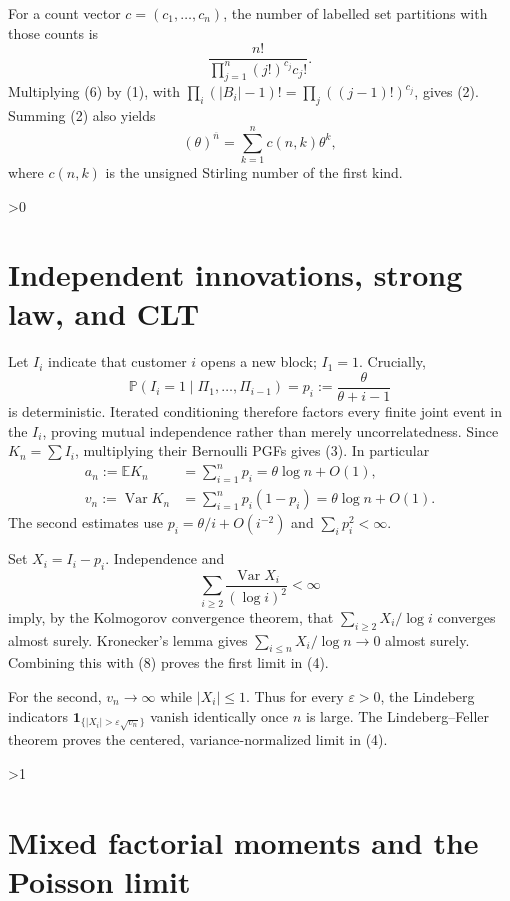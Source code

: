 \documentclass[10pt]{article}
\providecommand{\CRevisionRound}{2}
\theoremstyle{remark}
\newcommand{\rising}[2]{(#1)^{\overline{#2}}}
\begin{document}
For a count vector $c=(c_1,\ldots,c_n)$, the number of labelled set
partitions with those counts is
\[
 \frac{n!}{\prod_{j=1}^n(j!)^{c_j}c_j!}.                 \tag{6}
\]
Multiplying (6) by (1), with
$\prod_i(|B_i|-1)!=\prod_j((j-1)!)^{c_j}$, gives (2).
Summing (2) also yields
\[
 \rising{\theta}{n}=\sum_{k=1}^n c(n,k)\theta^k,
\]
where $c(n,k)$ is the unsigned Stirling number of the first kind.

\ifnum\CRevisionRound>0
\section{Independent innovations, strong law, and CLT}

Let $I_i$ indicate that customer $i$ opens a new block; $I_1=1$.
Crucially,
\[
 \mathbb P(I_i=1\mid\Pi_1,\ldots,\Pi_{i-1})
 =p_i:=\frac{\theta}{\theta+i-1}                         \tag{7}
\]
is deterministic.  Iterated conditioning therefore factors every finite
joint event in the $I_i$, proving mutual independence rather than merely
uncorrelatedness.  Since $K_n=\sum I_i$, multiplying their Bernoulli PGFs
gives (3).  In particular
\begin{align*}
 a_n:=\mathbb EK_n&=\sum_{i=1}^np_i=\theta\log n+O(1),\\
 v_n:=\operatorname{Var}K_n&=\sum_{i=1}^np_i(1-p_i)
                         =\theta\log n+O(1).              \tag{8}
\end{align*}
The second estimates use $p_i=\theta/i+O(i^{-2})$ and
$\sum_i p_i^2<\infty$.

Set $X_i=I_i-p_i$.  Independence and
\[
 \sum_{i\geq2}\frac{\operatorname{Var}X_i}{(\log i)^2}<\infty
\]
imply, by the Kolmogorov convergence theorem, that
$\sum_{i\geq2}X_i/\log i$ converges almost surely.  Kronecker's lemma gives
$\sum_{i\leq n}X_i/\log n\to0$ almost surely.  Combining this with (8)
proves the first limit in (4).

For the second, $v_n\to\infty$ while $|X_i|\leq1$.  Thus for every
$\varepsilon>0$, the Lindeberg indicators
$\mathbf1_{\{|X_i|>\varepsilon\sqrt{v_n}\}}$ vanish identically once $n$
is large.  The Lindeberg--Feller theorem proves the centered,
variance-normalized limit in (4).
\fi

\ifnum\CRevisionRound>1
\section{Mixed factorial moments and the Poisson limit}
\end{document}
